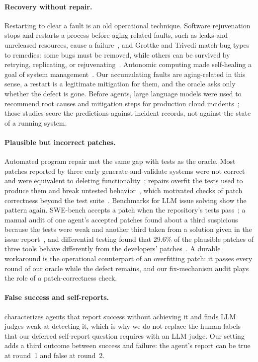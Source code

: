 \paragraph{Recovery without repair.} Restarting to clear a fault is an old operational technique. Software
rejuvenation stops and restarts a process before aging-related faults, such as leaks and unreleased resources, cause a
failure~\citep{huang1995rejuvenation}, and Grottke and Trivedi match bug types to remedies: some bugs must be removed,
while others can be survived by retrying, replicating, or rejuvenating~\citep{grottke2007fighting}. Autonomic computing
made self-healing a goal of system management~\citep{kephart2003autonomic}. Our accumulating faults are aging-related in
this sense, a restart is a legitimate mitigation for them, and the oracle asks only whether the defect is gone. Before
agents, large language models were used to recommend root causes and mitigation steps for production cloud
incidents~\citep{ahmed2023recommending,chen2024rcacopilot}; those studies score the predictions against incident records,
not against the state of a running system.

\paragraph{Plausible but incorrect patches.} Automated program repair met the same gap with tests as the oracle. Most
patches reported by three early generate-and-validate systems were not correct and were equivalent to deleting
functionality~\citep{qi2015plausibility}; repairs overfit the tests used to produce them and break untested
behavior~\citep{smith2015overfitting}, which motivated checks of patch correctness beyond the test
suite~\citep{xiong2018patchcorrectness}. Benchmarks for LLM issue solving show the pattern again. SWE-bench accepts a
patch when the repository's tests pass~\citep{jimenez2024swebench}; a manual audit of one agent's accepted patches found
about a third suspicious because the tests were weak and another third taken from a solution given in the issue
report~\citep{aleithan2024swebenchplus}, and differential testing found that 29.6\% of the plausible patches of three
tools behave differently from the developers' patches~\citep{wang2026solvedissues}. A durable workaround is the
operational counterpart of an overfitting patch: it passes every round of our oracle while the defect remains, and our
fix-mechanism audit plays the role of a patch-correctness check.

\paragraph{False success and self-reports.} \citet{advani2026false} characterizes agents that report success
without achieving it and finds LLM judges weak at detecting it, which is why we do not replace the human labels that our
deferred self-report question requires with an LLM judge. Our setting adds a third outcome between success and failure:
the agent's report can be true at round~1 and
false at round~2.

